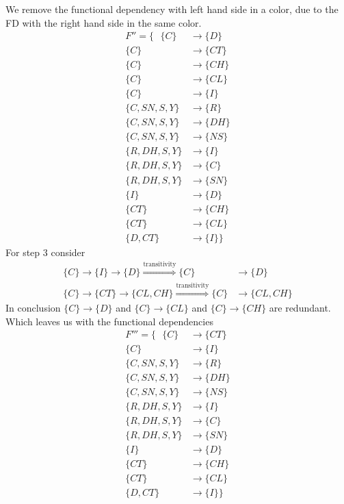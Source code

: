\documentclass{article}
\theoremstyle{remark}
\numberwithin{equation}{section}
\begin{document}
	We remove the functional dependency with left hand side in a color, due to the FD with the right hand side in the same color.
	\begin{align*}
	F'' = \{\text{ } 
	\{C\} &\rightarrow \{D \}\\
	\{C\} &\rightarrow \{CT\}\\
	\{C\} &\rightarrow \{CH \}\\
	\{C\} &\rightarrow \{CL\}\\
	\{C\} &\rightarrow \{I \}\\
	\{C,SN,S,Y\} &\rightarrow \{R\}\\
	\{C,SN,S,Y\} &\rightarrow \{DH\}\\
	\{C,SN,S,Y\} &\rightarrow \{NS\}\\
	\{R,DH,S,Y\} &\rightarrow \{I\}\\
	\{R,DH,S,Y\} &\rightarrow \{C\}\\
	\{R,DH,S,Y\} &\rightarrow \{SN \}\\
	\{I\} &\rightarrow \{D \}\\
	\{CT\} &\rightarrow \{CH\}\\
	\{CT\} &\rightarrow \{CL\}\\
	\{D,CT\} &\rightarrow \{I\} \}
	\end{align*}
	For step 3 consider
	\begin{align*}
	\{ C\} \rightarrow \{ I \} \rightarrow \{ D \} 
	\stackrel{\text{transitivity} }{\Rightarrow} \{ C  \} &\rightarrow \{ D \} \\
	\{ C\} \rightarrow \{ CT \} \rightarrow \{ CL, CH \} 
	\stackrel{\text{transitivity} }{\Rightarrow} \{ C  \} &\rightarrow \{ CL, CH \}
	\end{align*}
	In conclusion $\{C\} \rightarrow \{D\}$ and $\{C\} \rightarrow \{CL\}$ and $\{C\} \rightarrow \{CH\}$ are redundant.
	Which leaves us with the functional dependencies
	\begin{align*}
	F''' = \{\text{ } 
	\{C\} &\rightarrow \{CT\}\\
	\{C\} &\rightarrow \{I \}\\
	\{C,SN,S,Y\} &\rightarrow \{R\}\\
	\{C,SN,S,Y\} &\rightarrow \{DH\}\\
	\{C,SN,S,Y\} &\rightarrow \{NS\}\\
	\{R,DH,S,Y\} &\rightarrow \{I\}\\
	\{R,DH,S,Y\} &\rightarrow \{C\}\\
	\{R,DH,S,Y\} &\rightarrow \{SN \}\\
	\{I\} &\rightarrow \{D \}\\
	\{CT\} &\rightarrow \{CH\}\\
	\{CT\} &\rightarrow \{CL\}\\
	\{D,CT\} &\rightarrow \{I\} \}
	\end{align*}
\end{document}
